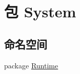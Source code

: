 \hypertarget{namespace_system}{\section{包 System}
\label{namespace_system}
}
\subsection*{命名空间}
\begin{DoxyCompactItemize}
\item 
package \hyperlink{namespace_system_1_1_runtime}{Runtime}
\end{DoxyCompactItemize}
